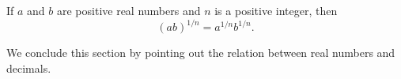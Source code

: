 \begin{myCorollary*}
    If $a$ and $b$ are positive real numbers 
    and $n$ is a positive integer, 
    then
    \begin{equation*}
        (ab)^{1/n}= a^{1/n}b^{1/n}.
    \end{equation*}
\end{myCorollary*}

\begin{mydef}
    \label{mydef:1.22}
    We conclude this section by pointing out the relation between real numbers and decimals.
\end{mydef}

